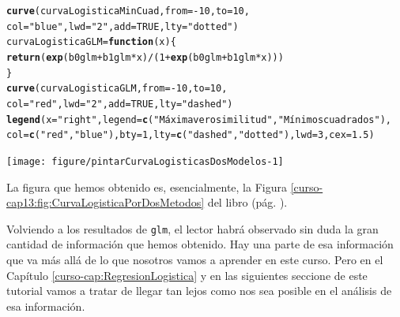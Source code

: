 \documentclass[10pt,a4paper]{article}\usepackage[]{graphicx}\usepackage[]{color}
\makeatletter
\newcommand{\hlnum}[1]{\textcolor[rgb]{0.686,0.059,0.569}{#1}}%
\newcommand{\hlstr}[1]{\textcolor[rgb]{0.192,0.494,0.8}{#1}}%
\newcommand{\hlopt}[1]{\textcolor[rgb]{0,0,0}{#1}}%
\newcommand{\hlstd}[1]{\textcolor[rgb]{0.345,0.345,0.345}{#1}}%
\newcommand{\hlkwa}[1]{\textcolor[rgb]{0.161,0.373,0.58}{\textbf{#1}}}%
\newcommand{\hlkwb}[1]{\textcolor[rgb]{0.69,0.353,0.396}{#1}}%
\newcommand{\hlkwc}[1]{\textcolor[rgb]{0.333,0.667,0.333}{#1}}%
\newcommand{\hlkwd}[1]{\textcolor[rgb]{0.737,0.353,0.396}{\textbf{#1}}}%
\newenvironment{kframe}{%
 \def\at@end@of@kframe{}%
 \ifinner\ifhmode%
  \def\at@end@of@kframe{\end{minipage}}%
  \begin{minipage}{\columnwidth}%
 \fi\fi%
 \def\FrameCommand##1{\hskip\@totalleftmargin \hskip-\fboxsep
 \colorbox{shadecolor}{##1}\hskip-\fboxsep
     \hskip-\linewidth \hskip-\@totalleftmargin \hskip\columnwidth}%
 \MakeFramed {\advance\hsize-\width
   \@totalleftmargin\z@ \linewidth\hsize
   \@setminipage}}%
 {\par\unskip\endMakeFramed%
 \at@end@of@kframe}
\newenvironment{knitrout}{}{} %
\makeatother
\begin{document}
\begin{knitrout}
\color{fgcolor}\begin{kframe}
\begin{alltt}
\hlkwd{curve}\hlstd{(curvaLogisticaMinCuad,} \hlkwc{from} \hlstd{=} \hlopt{-}\hlnum{10}\hlstd{,} \hlkwc{to} \hlstd{=} \hlnum{10}\hlstd{,}
      \hlkwc{col}\hlstd{=}\hlstr{"blue"}\hlstd{,} \hlkwc{lwd}\hlstd{=}\hlstr{"2"}\hlstd{,} \hlkwc{add}\hlstd{=}\hlnum{TRUE}\hlstd{,} \hlkwc{lty}\hlstd{=}\hlstr{"dotted"}\hlstd{)}
\hlstd{curvaLogisticaGLM} \hlkwb{=} \hlkwa{function}\hlstd{(}\hlkwc{x}\hlstd{)\{}
  \hlkwd{return}\hlstd{(}\hlkwd{exp}\hlstd{(b0glm} \hlopt{+} \hlstd{b1glm} \hlopt{*} \hlstd{x)}\hlopt{/}\hlstd{(}\hlnum{1} \hlopt{+} \hlkwd{exp}\hlstd{(b0glm} \hlopt{+} \hlstd{b1glm} \hlopt{*} \hlstd{x)))}
\hlstd{\}}
\hlkwd{curve}\hlstd{(curvaLogisticaGLM,} \hlkwc{from} \hlstd{=} \hlopt{-}\hlnum{10}\hlstd{,} \hlkwc{to} \hlstd{=} \hlnum{10}\hlstd{,}
      \hlkwc{col}\hlstd{=}\hlstr{"red"}\hlstd{,} \hlkwc{lwd}\hlstd{=}\hlstr{"2"}\hlstd{,} \hlkwc{add}\hlstd{=}\hlnum{TRUE}\hlstd{,} \hlkwc{lty}\hlstd{=}\hlstr{"dashed"}\hlstd{)}
\hlkwd{legend}\hlstd{(}\hlkwc{x}\hlstd{=}\hlstr{"right"}\hlstd{,} \hlkwc{legend}\hlstd{=}\hlkwd{c}\hlstd{(}\hlstr{"Máxima verosimilitud"}\hlstd{,} \hlstr{"Mínimos cuadrados"}\hlstd{),}
       \hlkwc{col} \hlstd{=} \hlkwd{c}\hlstd{(}\hlstr{"red"}\hlstd{,} \hlstr{"blue"}\hlstd{),} \hlkwc{bty}\hlstd{=}\hlnum{1}\hlstd{,} \hlkwc{lty}\hlstd{=}\hlkwd{c}\hlstd{(}\hlstr{"dashed"}\hlstd{,}\hlstr{"dotted"}\hlstd{),}\hlkwc{lwd}\hlstd{=}\hlnum{3}\hlstd{,}\hlkwc{cex}\hlstd{=}\hlnum{1.5}\hlstd{)}
\end{alltt}
\end{kframe}

{\centering \texttt{[image: figure/pintarCurvaLogisticasDosModelos-1]} 

}



\end{knitrout}




La figura que hemos obtenido es, esencialmente, la Figura \ref{curso-cap13:fig:CurvaLogisticaPorDosMetodos} del libro (pág. \pageref{curso-cap13:fig:CurvaLogisticaPorDosMetodos}).

Volviendo a los resultados de {\tt glm}, el lector habrá observado sin duda la gran cantidad de información que hemos obtenido. Hay una parte de esa información que va más allá de lo que nosotros vamos a aprender en este curso. Pero en el Capítulo \ref{curso-cap:RegresionLogistica} y en las siguientes seccione de este tutorial vamos a tratar de llegar tan lejos como nos sea posible en el análisis de esa información.
\end{document}

